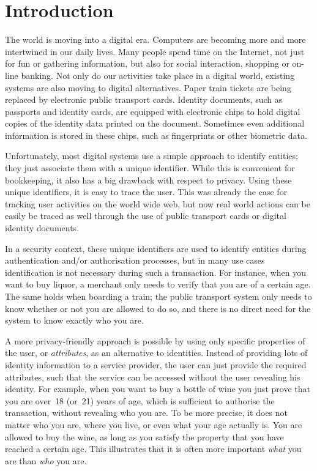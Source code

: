 \chapter{Introduction}

The world is moving into a digital era. Computers are becoming more and more
intertwined in our daily lives. Many people spend time on the Internet, not just
for fun or gathering information, but also for social interaction, shopping or
on-line banking. Not only do our activities take place in a digital world,
existing systems are also moving to digital alternatives. Paper train tickets
are being replaced by electronic public transport cards. Identity documents,
 such as passports and identity cards, are equipped
with electronic chips to hold digital copies of the identity data printed on the
document. Sometimes even additional information is stored in these chips, such
as fingerprints or other biometric data.

Unfortunately, most digital systems use a simple approach to identify entities;
they just associate them with a unique identifier.
While this is convenient for bookkeeping, it also has a big drawback with
respect to privacy. Using these unique identifiers, it
is easy to trace the user. This was already the case for tracking user
activities on the world wide web, but now real world actions can be easily be
traced as well through the use of public transport cards or digital identity
documents.

In a security context, these unique identifiers are
used to identify entities during authentication and/or
authorisation processes, but in many use cases
identification is not necessary during such a transaction. For instance, when
you want to buy liquor, a merchant only needs to verify that you are of a
certain age. The same holds when boarding a train; the public transport system
only needs to know whether or not you are allowed to do so, and there is no
direct need for the system to know exactly who you are.

A more privacy-friendly approach is possible by using only specific properties
of the user, or \emph{attributes}, as an alternative to
identities. Instead of providing lots of identity
information to a service provider, the user can just provide the required
attributes, such that the service can be accessed without the user revealing his
identity. For example, when you want to buy a bottle of wine you just prove that
you are over~18 (or~21) years of age, which is sufficient to
authorise the transaction, without revealing who you are.
To be more precise, it does not matter who you are, where
you live, or even what your age actually is. You are allowed to buy the wine, as
long as you satisfy the property that you have reached a certain age. This
illustrates that it is often more important \emph{what} you are than \emph{who}
you are.

